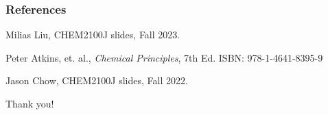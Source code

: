 \documentclass[aspectratio=169]{beamer}
\begin{document}
\begin{frame}
  \frametitle{References}
  
  \begin{thebibliography}{99} %
  Milias Liu, CHEM2100J slides, Fall 2023.
    
  Peter Atkins, et. al., \textit{Chemical Principles}, 7th Ed. ISBN: 978-1-4641-8395-9

  Jason Chow, CHEM2100J slides, Fall 2022.
    
  \end{thebibliography}
  \end{frame}

\begin{frame}
  \Huge{\centerline{Thank you!}}
\end{frame}
\end{document}
